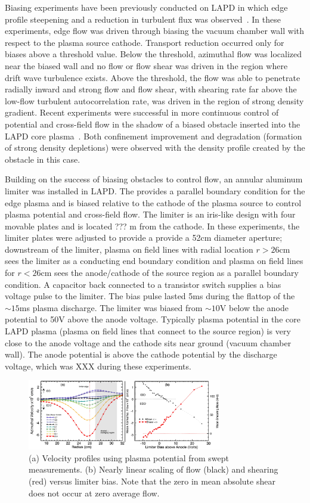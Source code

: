 \documentclass[aps,prl,amsmath,amssymb,preprint,superscriptaddress]{revtex4}
\begin{document}
Biasing experiments have been previously conducted on LAPD in which edge profile steepening and a reduction in turbulent flux was observed~\cite{maggs07,carter09}. In these experiments, edge flow was driven through biasing the vacuum chamber wall with respect to the plasma source cathode.  Transport reduction occurred only for biases above a threshold value.  Below the threshold, azimuthal flow was localized near the biased wall and no flow or flow shear was driven in the region where drift wave turbulence exists.  Above the threshold, the flow was able to penetrate radially inward and strong flow and flow shear, with shearing rate far above the low-flow turbulent autocorrelation rate, was driven in the region of strong density gradient.   Recent experiments were successful in more continuous control of potential and cross-field flow in the shadow of a biased obstacle inserted into the LAPD core plasma~\cite{zhou12}.  Both confinement improvement and degradation (formation of strong density depletions) were observed with the density profile created by the obstacle in this case.  

Building on the success of biasing obstacles to control flow, an annular aluminum limiter was installed in LAPD. The provides a parallel boundary condition for the edge plasma and is biased relative to the cathode of the plasma source to control plasma potential and cross-field flow.  The limiter is
an iris-like design with four movable plates and is located ??? m from
the cathode.  In these experiments, the limiter plates were adjusted
to provide a provide a 52cm diameter aperture; downstream of the
limiter, plasma on field lines with radial location $r>26$cm sees the
limiter as a conducting end boundary condition and plasma on field
lines for $r<26$cm sees the anode/cathode of the source region as a
parallel boundary condition.  A capacitor back connected to a transistor switch supplies a bias voltage pulse to the limiter.  The
bias pulse lasted 5ms during the flattop of the $\sim 15$ms plasma
discharge. The limiter was biased from $\sim 10$V below the anode
potential to 50V above the anode voltage.  Typically plasma potential
in the core LAPD plasma (plasma on field lines that connect to the
source region) is very close to the anode voltage and the cathode sits
near ground (vacuum chamber wall).  The anode potential is above the
cathode potential by the discharge voltage, which was XXX during these experiments.

\begin{figure}[!htbp]
\centerline{
\includegraphics[width=8.5cm]{velocity_flowshear.pdf}}
\caption{\label{fig:velocity_flowshear} (a) Velocity profiles using plasma potential from swept measurements. (b) Nearly linear scaling of flow (black) and shearing (red) versus limiter bias. Note that the zero in mean absolute shear does not occur at zero average flow.}
\end{figure}
\end{document}
